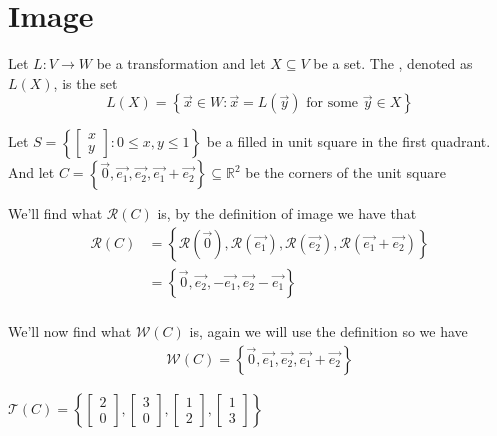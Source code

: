 \documentclass[notoc,notitlepage]{tufte-book}
\newcommand\mat[1]{\begin{bmatrix}#1\end{bmatrix}}
\begin{document}

\section{Image}%
\label{sec:image}

\begin{defn}[Image]\label{defn:image}
    Let $L : V \to W $ be a transformation and let $X \subseteq V$ be a set. The
    , denoted as $L\left(X\right)$, is
    the set
    \begin{equation*}
        L\left(X\right) = \left\{ \vec{x} \in W: \vec{x} =
        L\left(\vec{y}\right) \text{ for some  } \vec{y} \in X \right\}
    \end{equation*}
\end{defn}

Let $S = \left\{ \mat{ x \\ y }: 0 \le x, y \le 1 \right\}$ be a filled in unit
square in the first quadrant. And let $C = \left\{ \vec{0}, \vec{e_1},
\vec{e_2}, \vec{e_1} + \vec{e_2} \right\} \subseteq \mathbb{R}^2$ be the corners of the unit square 

\begin{ex}
    We'll find what $\mathcal{R}\left(C\right)$ is, by the definition of image we have that
    \begin{align*}
        \mathcal{R}\left(C\right) &= \left\{ \mathcal{R}\left(\vec{0}\right), \mathcal{R}\left(\vec{e_1}\right), \mathcal{R}\left(\vec{e_2}\right), \mathcal{R}\left(\vec{e_1} + \vec{e_2}\right) \right\}\\
                                  &= \left\{ \vec{0}, \vec{e_2}, -\vec{e_1}, \vec{e_2} - \vec{e_1} \right\}\\
    \end{align*}
\end{ex}

\begin{ex}
    We'll now find what $\mathcal{W}\left(C\right)$  is, again we will use the definition so we have
    \begin{align*}
        \mathcal{W}\left(C\right) = \left\{ \vec{0}, \vec{e_1}, \vec{e_2}, \vec{e_1} + \vec{e_2} \right\}
    \end{align*}
\end{ex}

\begin{ex}
    $\mathcal{T}\left(C\right) = \left\{ \mat{ 2 \\ 0 }, \mat{ 3 \\ 0 }, \mat{ 1 \\ 2 }, \mat{ 1 \\ 3 } \right\}$ 
\end{ex}
\end{document}
